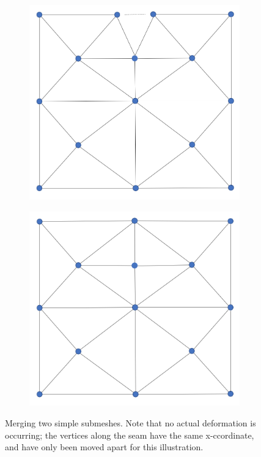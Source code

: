 \documentclass{article}
\begin{document}
\begin{figure}[H]
\begin{subfigure}[b]{0.2\linewidth}
    \caption{}
  \end{subfigure}
  \begin{subfigure}[b]{0.2\linewidth}
    \includegraphics[width=\linewidth]{Fig_mesh_merge_03.png}
    \caption{}
  \end{subfigure}
  \begin{subfigure}[b]{0.2\linewidth}
    \includegraphics[width=\linewidth]{Fig_mesh_merge_04.png}
    \caption{}
  \end{subfigure}
  \caption{Merging two simple submeshes. Note that no actual deformation is occurring; the vertices along the seam have the same x-ccordinate, and have only been moved apart for this illustration.}
\end{figure}
\end{document}
